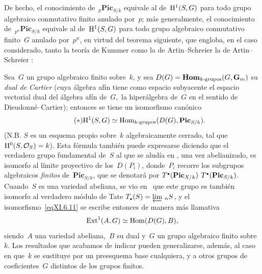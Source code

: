 \begin{remarques}
De hecho, el conocimiento de~${_p}\mathbf{Pic}_{S/k}$ equivale al
de~$\mathrm H^1(S,G)$ para todo grupo algebraico
conmutativo finito anulado por~$p$; más generalmente, el conocimiento
de~${_{p^n}}\mathbf{Pic}_{S/k}$ equivale al de~$\mathrm H^1(S,G)$ para todo grupo
algebraico conmutativo finito~$G$ anulado por~$p^n$, en virtud del teorema
siguiente, que engloba, en el caso considerado, tanto la teoría de Kummer
como
{la de Artin--Schreier}
{la de Artin--Schreier}
:

Sea~$G$ un grupo algebraico finito sobre~$k$, y sea
$D(G)=\operatorname{\mathbf{Hom}}_{k\textup{-grupos}}(G,\mathbf{G}_m)$ su \emph{dual de Cartier} (cuya
álgebra afín tiene como espacio subyacente el espacio vectorial dual del
álgebra afín de~$G$, \,\ie la hiperálgebra de~$G$ en el sentido de
Dieudonné--Cartier); entonces se tiene un isomorfismo canónico
\begin{equation}\label{eqXI.6.11}\tag{$*$}
\mathrm H^1(S,G)\simeq\operatorname{Hom}_{k\textup{-grupos}}(D(G),\mathbf{Pic}_{S/k}).
\end{equation}
(N.B. $S$ es un esquema propio sobre~$k$ algebraicamente cerrado, tal que
$\mathrm H^0(S,\mathcal{O}_S)=k$). Esta fórmula también puede expresarse diciendo que
el \og verdadero grupo fundamental\fg{} de~$S$ al que se aludía en
, una vez abelianizado, es isomorfo al límite proyectivo de
los~$D(P_i)$, donde~$P_i$ recorre los subgrupos algebraicos \emph{finitos}
de~$\mathbf{Pic}_{S/k}$, que se denotará por
{$T^{\scriptscriptstyle\bullet}(\mathbf{Pic}_{X/k})$}
{$T^{\scriptscriptstyle\bullet}(\mathbf{Pic}_{S/k})$}.
Cuando~$S$ es una variedad abeliana, se vio en~ que este grupo
es también isomorfo al \og verdadero\fg{} módulo de Tate
$T_{{\scriptscriptstyle\bullet}}(S)=\varprojlim\, {{_n}S}$, y el
isomorfismo~\eqref{eqXI.6.11} se escribe entonces de manera más llamativa
$$
\operatorname{Ext}^1(A,G)\simeq\operatorname{Hom}(D(G),B),
$$
siendo~$A$ una variedad abeliana,~$B$ su dual y~$G$ un grupo algebraico
finito sobre~$k$. Los resultados que acabamos de indicar pueden generalizarse,
además, al caso en que~$k$ se sustituye por un preesquema base cualquiera, y
a otros grupos de coeficientes~$G$ distintos de los grupos finitos.
\end{remarques}

